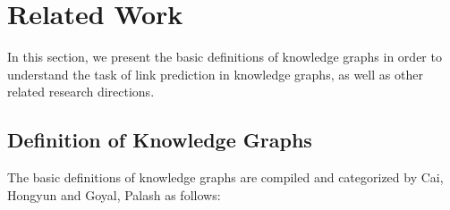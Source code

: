 \section{Related Work}
\label{chap:RelatedWork}

In this section, we present the basic definitions of knowledge graphs in order to understand the task of link prediction in knowledge graphs, as well as other related research directions.

\subsection{Definition of Knowledge Graphs}

The basic definitions of knowledge graphs are compiled and categorized by Cai, Hongyun \cite{cai2018comprehensive} and Goyal, Palash \cite{goyal2018graph} as follows:



